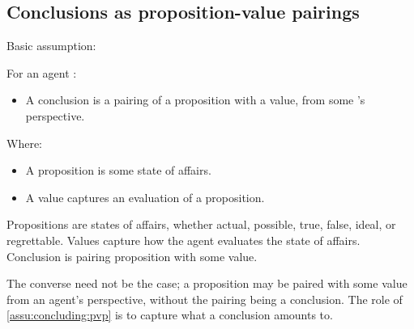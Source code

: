 \subsection{Conclusions as proposition-value pairings}
\label{cha:introduction:sec:CCC:pvp}

\begin{note}
  Basic assumption:

  \begin{assumption}
    \label{assu:concluding:pvp}
    For an agent \vAgent{}:

    \begin{itemize}
    \item
      A conclusion is a pairing of a proposition with a value, from some \vAgent{}'s perspective.
    \end{itemize}

    Where:
    \begin{itemize}[noitemsep]
    \item
      A proposition is some state of affairs.
    \item
      A value captures an evaluation of a proposition.
    \end{itemize}
  \end{assumption}

  Propositions are states of affairs, whether actual, possible, true, false, ideal, or regrettable.
  Values capture how the agent evaluates the state of affairs.
  Conclusion is pairing proposition with some value.

  The converse need not be the case; a proposition may be paired with some value from an agent's perspective, without the pairing being a conclusion.
  The role of \autoref{assu:concluding:pvp} is to capture what a conclusion amounts to.
\end{note}


